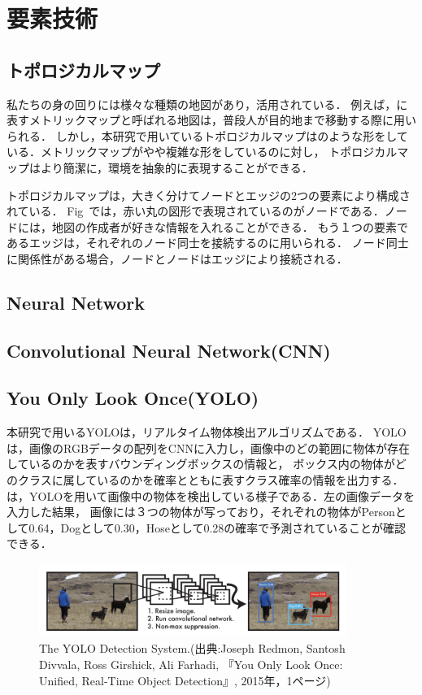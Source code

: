 \documentclass[../main]{subfiles}
\begin{document}
\setcounter{secnumdepth}{4}
    \chapter{要素技術}
        \section{トポロジカルマップ}
        私たちの身の回りには様々な種類の地図があり，活用されている．
        例えば，に表すメトリックマップと呼ばれる地図は，普段人が目的地まで移動する際に用いられる．
        しかし，本研究で用いているトポロジカルマップはのような形をしている．メトリックマップがやや複雑な形をしているのに対し，
        トポロジカルマップはより簡潔に，環境を抽象的に表現することができる．

        
        トポロジカルマップは，大きく分けてノードとエッジの2つの要素により構成されている．
        Fig~では，赤い丸の図形で表現されているのがノードである．ノードには，地図の作成者が好きな情報を入れることができる．
        もう１つの要素であるエッジは，それぞれのノード同士を接続するのに用いられる．
        ノード同士に関係性がある場合，ノードとノードはエッジにより接続される．
    
        \section{Neural Network}
        \section{Convolutional Neural Network(CNN)}
        \section{You Only Look Once(YOLO)}
        本研究で用いるYOLO\cite{yolo_paper}は，リアルタイム物体検出アルゴリズムである．
        YOLOは，画像のRGBデータの配列をCNNに入力し，画像中のどの範囲に物体が存在しているのかを表すバウンディングボックスの情報と，
        ボックス内の物体がどのクラスに属しているのかを確率とともに表すクラス確率の情報を出力する．
        は，YOLOを用いて画像中の物体を検出している様子である．左の画像データを入力した結果，
        画像には３つの物体が写っており，それぞれの物体がPersonとして0.64，Dogとして0.30，Hoseとして0.28の確率で予測されていることが確認できる． 

        \begin{figure}[H]
        \centering
        \includegraphics[width=10cm]{yolo_exp.png}
        \caption{The YOLO Detection System.(出典:Joseph Redmon, Santosh Divvala, Ross Girshick, Ali Farhadi, 『You Only Look Once: Unified, Real-Time Object Detection』, 2015年，1ページ)}
        \label{figure::yolo_exp}
        \end{figure}
    
\end{document}
